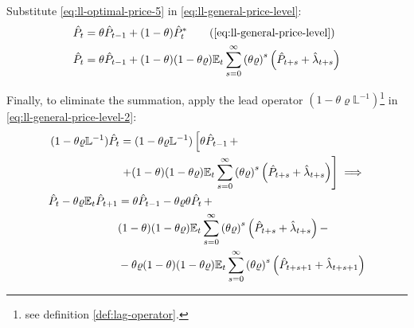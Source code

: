 \documentclass[
thesis.tex
]{subfiles}
\begin{document}
	Substitute \ref{eq:ll-optimal-price-5} in \ref{eq:ll-general-price-level}:
	\begin{align}
		\hat{P}_t &= \theta \hat{P}_{t-1} + (1-\theta) \hat{P}_t^\ast \tag{\ref{eq:ll-general-price-level}}\\
		\hat{P}_t &= \theta \hat{P}_{t-1} + (1-\theta) (1- \theta \varrho) \E \sum_{s=0}^{\infty} \left( \theta \varrho \right)^s \left( \hat{P}_{t+s} + \hat{\lambda}_{t+s} \right) \label{eq:ll-general-price-level-2}
	\end{align}
	
	Finally, to eliminate the summation, apply the lead operator $(1- \theta \varrho \mathbb{L}^{-1})$\footnote{see definition \ref{def:lag-operator}.} in \ref{eq:ll-general-price-level-2}:
	\begin{align}
		\begin{split}
			(1- \theta \varrho \mathbb{L}^{-1}) \hat{P}_t &= (1- \theta \varrho \mathbb{L}^{-1}) \left[ \theta \hat{P}_{t-1} \, + \right. \\
			&\left. + (1-\theta) (1- \theta \varrho) {\mathbb{E}_{t}} \sum_{s=0}^{\infty} \left( \theta \varrho \right)^s \left( \hat{P}_{t+s} + \hat{\lambda}_{t+s} \right) \right] \implies \nonumber
		\end{split} \\
		\begin{split}
			\hat{P}_t - \theta \varrho {\mathbb{E}_{t}} \hat{P}_{t+1} &= \theta \hat{P}_{t-1} - \theta \varrho \theta \hat{P}_t \, + \\
			& (1-\theta) (1- \theta \varrho) {\mathbb{E}_{t}} \sum_{s=0}^{\infty} \left( \theta \varrho \right)^s \left( \hat{P}_{t+s} + \hat{\lambda}_{t+s} \right) - \\
			& - \theta \varrho (1-\theta) (1- \theta \varrho) {\mathbb{E}_{t}} \sum_{s=0}^{\infty} \left( \theta \varrho \right)^s \left( \hat{P}_{t+s+1} + \hat{\lambda}_{t+s+1} \right)
		\end{split} \label{eq:ll-general-price-level-3}
	\end{align}
	
\end{document}
